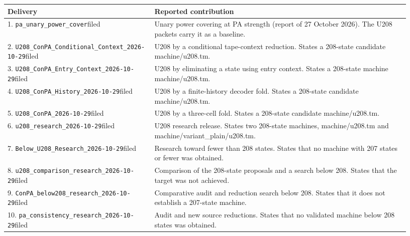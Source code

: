 {\small
\begin{longtable}{@{}p{0.34\linewidth}p{0.59\linewidth}@{}}
\toprule Delivery&Reported contribution\\\midrule\endhead
1. \nolinkurl{pa_unary_power_cover}\newline filed&Unary power covering at PA strength (report of 27 October 2026). The U208 packets carry it as a baseline.\\[4pt]
2. \nolinkurl{U208_ConPA_Conditional_Context_2026-10-29}\newline filed&U208 by a conditional tape-context reduction. States a 208-state candidate machine/u208.tm.\\[4pt]
3. \nolinkurl{U208_ConPA_Entry_Context_2026-10-29}\newline filed&U208 by eliminating a state using entry context. States a 208-state machine machine/u208.tm.\\[4pt]
4. \nolinkurl{U208_ConPA_History_2026-10-29}\newline filed&U208 by a finite-history decoder fold. States a 208-state candidate machine/u208.tm.\\[4pt]
5. \nolinkurl{U208_ConPA_2026-10-29}\newline filed&U208 by a three-cell fold. States a 208-state candidate machine/u208.tm.\\[4pt]
6. \nolinkurl{u208_research_2026-10-29}\newline filed&U208 research release. States two 208-state machines, machine/u208.tm and machine/variant\_plain/u208.tm.\\[4pt]
7. \nolinkurl{Below_U208_Research_2026-10-29}\newline filed&Research toward fewer than 208 states. States that no machine with 207 states or fewer was obtained.\\[4pt]
8. \nolinkurl{u208_comparison_research_2026-10-29}\newline filed&Comparison of the 208-state proposals and a search below 208. States that the target was not achieved.\\[4pt]
9. \nolinkurl{ConPA_below208_research_2026-10-29}\newline filed&Comparative audit and reduction search below 208. States that it does not establish a 207-state machine.\\[4pt]
10. \nolinkurl{pa_consistency_research_2026-10-29}\newline filed&Audit and new source reductions. States that no validated machine below 208 states was obtained.\\[4pt]

\end{longtable}}
